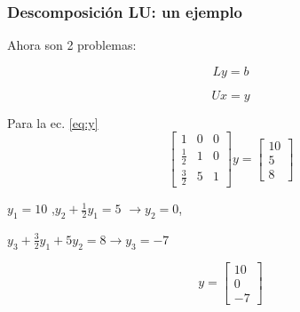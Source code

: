 \documentclass[xcolor=svgnames]{beamer} %
\theoremstyle{plain}
\theoremstyle{definition}
\begin{document}
\begin{frame}
\frametitle{Descomposición LU: un ejemplo}
Ahora son 2 problemas:

\begin{minipage}{.45\linewidth}
\begin{equation}\label{eq:y}
L y = b
\end{equation}
\end{minipage}  \begin{minipage}{.45\linewidth}
\begin{equation}\label{eq:x}
U x = y
\end{equation}
\end{minipage}
\pause

Para la ec. \ref{eq:y}
$$\begin{bmatrix}
1 			& 0 & 0 \\
\frac{1}{2} 	& 1 & 0 \\
\frac{3}{2} 	& 5 & 1 
\end{bmatrix} y = \begin{bmatrix}
10\\ 
5\\
8
\end{bmatrix} $$

\begin{minipage}{.6\linewidth}
\pause

$y_1 = 10$ ,\pause $y_2 +\frac{1}{2} y_1 = 5$ \pause $\rightarrow y_2 = 0$, \pause 

$y_3 +\frac{3}{2} y_1 + 5 y_2 = 8 \rightarrow y_3 =-7$ 

\end{minipage} \vline  \begin{minipage}{.3\linewidth}
$$\boxed{y = \begin{bmatrix}
10\\
0\\
-7
\end{bmatrix} }$$
\end{minipage}

\end{frame}
\end{document}
